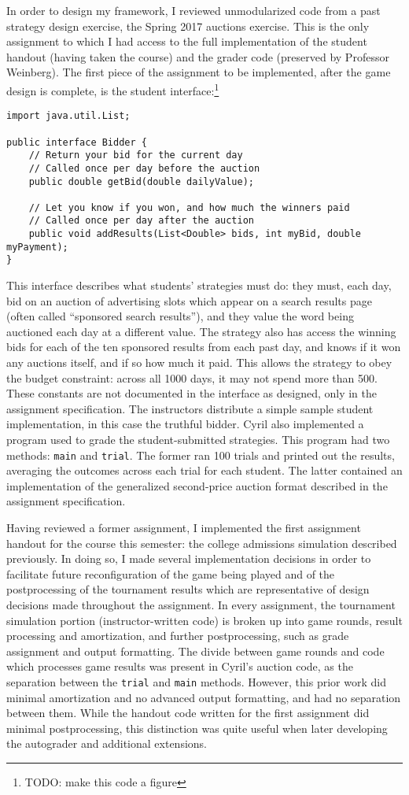 \documentclass[pageno]{jpaper}
\begin{document}
In order to design my framework, I reviewed unmodularized code from a past strategy design exercise, the Spring 2017 auctions exercise.
This is the only assignment to which I had access to the full implementation of the student handout (having taken the course) and the grader code (preserved by Professor Weinberg).
The first piece of the assignment to be implemented, after the game design is complete, is the student interface:\footnote{TODO: make this code a figure}
\begin{verbatim}
import java.util.List;

public interface Bidder {
    // Return your bid for the current day
    // Called once per day before the auction
    public double getBid(double dailyValue);

    // Let you know if you won, and how much the winners paid
    // Called once per day after the auction
    public void addResults(List<Double> bids, int myBid, double myPayment);
}
\end{verbatim}
This interface describes what students' strategies must do: they must, each day, bid on an auction of advertising slots which appear on a search results page (often called ``sponsored search results''), and they value the word being auctioned each day at a different value.
The strategy also has access the winning bids for each of the ten sponsored results from each past day, and knows if it won any auctions itself, and if so how much it paid.
This allows the strategy to obey the budget constraint: across all 1000 days, it may not spend more than 500.
These constants are not documented in the interface as designed, only in the assignment specification.
The instructors distribute a simple sample student implementation, in this case the truthful bidder.
Cyril also implemented a program used to grade the student-submitted strategies.
This program had two methods: \texttt{main} and \texttt{trial}.
The former ran 100 trials and printed out the results, averaging the outcomes across each trial for each student.
The latter contained an implementation of the generalized second-price auction format described in the assignment specification.

Having reviewed a former assignment, I implemented the first assignment handout for the course this semester: the college admissions simulation described previously.
In doing so, I made several implementation decisions in order to facilitate future reconfiguration of the game being played and of the postprocessing of the tournament results which are representative of design decisions made throughout the assignment.
In every assignment, the tournament simulation portion (instructor-written code) is broken up into game rounds, result processing and amortization, and further postprocessing, such as grade assignment and output formatting.
The divide between game rounds and code which processes game results was present in Cyril's auction code, as the separation between the \texttt{trial} and \texttt{main} methods.
However, this prior work did minimal amortization and no advanced output formatting, and had no separation between them.
While the handout code written for the first assignment did minimal postprocessing, this distinction was quite useful when later developing the autograder and additional extensions.
\end{document}
